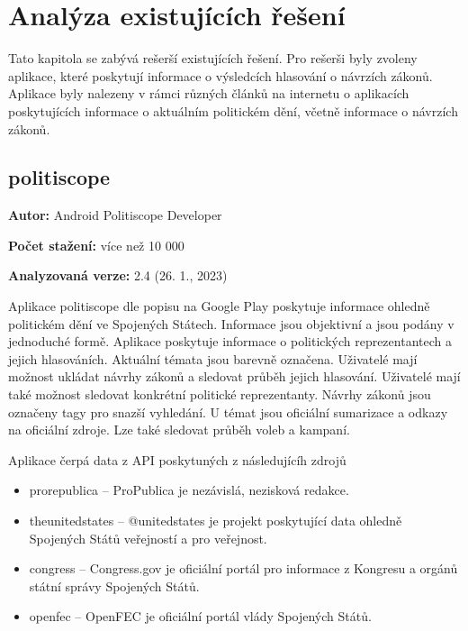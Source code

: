 \chapter{Analýza existujících řešení}

\begin{chapterabstract}
Tato kapitola se zabývá rešerší existujících řešení. Pro rešerši byly zvoleny aplikace, které poskytují informace o výsledcích hlasování o návrzích zákonů. Aplikace byly nalezeny v rámci různých článků na internetu o aplikacích poskytujících informace o aktuálním politickém \linebreak dění, včetně informace o návrzích zákonů.
\end{chapterabstract}

\section{politiscope}

\begin{description}
	\item \textbf{Autor:} Android Politiscope Developer
	\item \textbf{Počet stažení:} více než 10 000
	\item \textbf{Analyzovaná verze:} 2.4 (26. 1., 2023)
\end{description}

\noindent Aplikace politiscope \cite{politiscope} dle popisu na Google Play poskytuje informace ohledně politickém dění ve Spojených Státech. Informace jsou objektivní a jsou podány v jednoduché formě. Aplikace poskytuje informace o politických reprezentantech a jejich hlasováních. Aktuální témata jsou barevně označena. Uživatelé mají možnost ukládat návrhy zákonů a sledovat průběh jejich hlasování. Uživatelé mají také možnost sledovat konkrétní politické reprezentanty. Návrhy zákonů jsou označeny tagy pro snazší vyhledání. U témat jsou oficiální sumarizace a odkazy na oficiální zdroje. Lze také sledovat průběh voleb a kampaní.

Aplikace čerpá data z API poskytuných z následujícíh zdrojů

\begin{itemize}
	\item prorepublica \cite{propublica} -- ProPublica je nezávislá, nezisková redakce.
	\item theunitedstates \cite{unitedstates} -- @unitedstates je projekt poskytující data ohledně Spojených Států veřejností a pro veřejnost.
	\item congress \cite{congress} -- Congress.gov je oficiální portál pro informace z Kongresu a orgánů státní správy Spojených Států.
	\item openfec \cite{openfec} -- OpenFEC je oficiální portál vlády Spojených Států.
\end{itemize}

